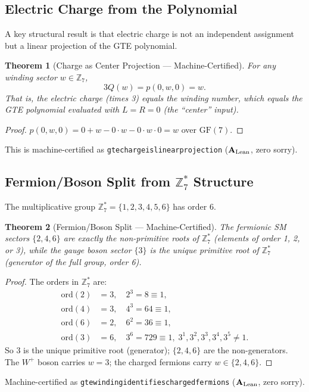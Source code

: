 \documentclass[11pt]{article}
\newtheorem{theorem}{Theorem}[section]
\theoremstyle{remark}
\newcommand{\ZS}{\mathbb{Z}_7}
\newcommand{\lean}[1]{%
  \penalty-100
  \begingroup\def\_{\textunderscore\allowbreak}\texttt{#1}\endgroup}
\newcommand{\CatAL}{\ensuremath{\textbf{A}_{\rm Lean}}}
\newcommand{\FF}{\mathrm{GF}}
\begin{document}
\subsection{Electric Charge from the Polynomial}

A key structural result is that electric charge is not an independent
assignment but a linear projection of the GTE polynomial.

\begin{theorem}[Charge as Center Projection — Machine-Certified]
\label{thm:charge}
For any winding sector $w \in \ZS$,
\[
  3Q(w) = p(0, w, 0) = w.
\]
That is, the electric charge (times 3) equals the winding number, which
equals the GTE polynomial evaluated with $L = R = 0$ (the ``center''
input).
\end{theorem}
\begin{proof}
$p(0,w,0) = 0 + w - 0 \cdot w - 0 \cdot w \cdot 0 = w$ over $\FF(7)$. \qedhere
\end{proof}
This is machine-certified as \lean{gte\_charge\_is\_linear\_projection}
($\CatAL$, zero sorry).

\subsection{Fermion/Boson Split from \texorpdfstring{$\ZS^*$}{Z7*} Structure}

The multiplicative group $\ZS^* = \{1,2,3,4,5,6\}$ has order 6.

\begin{theorem}[Fermion/Boson Split --- Machine-Certified]
\label{thm:fb-split}
The fermionic SM sectors $\{2, 4, 6\}$ are exactly the non-primitive roots
of $\ZS^*$ (elements of order 1, 2, or 3), while the gauge boson sector
$\{3\}$ is the unique primitive root of $\ZS^*$ (generator of the full
group, order 6).
\end{theorem}
\begin{proof}
The orders in $\ZS^*$ are:
\begin{align*}
  \text{ord}(2) &= 3, \quad 2^3 = 8 \equiv 1, \\
  \text{ord}(4) &= 3, \quad 4^3 = 64 \equiv 1, \\
  \text{ord}(6) &= 2, \quad 6^2 = 36 \equiv 1, \\
  \text{ord}(3) &= 6, \quad 3^6 = 729 \equiv 1,\;
                  3^1,3^2,3^3,3^4,3^5 \neq 1.
\end{align*}
So $3$ is the unique primitive root (generator); $\{2,4,6\}$ are the
non-generators. The $W^+$ boson carries $w = 3$; the charged fermions
carry $w \in \{2,4,6\}$.
\end{proof}
Machine-certified as \lean{gte\_winding\_identifies\_charged\_fermions}
($\CatAL$, zero sorry).
\end{document}
